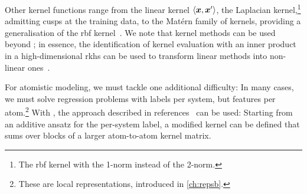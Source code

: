 Other kernel functions range from the linear kernel $\braket{\boldsymbol{x}, \boldsymbol{x}'}$, the Laplacian kernel,\footnote{The \gls{rbf} kernel with the 1-norm instead of the 2-norm.} admitting cusps at the training data, to the Matérn family of kernels, providing a generalisation of the \gls{rbf} kernel~\cite{r2015Bq,rasmussen2006}.
We note that kernel methods can be used beyond \krr; in essence, the identification of kernel evaluation with an inner product in a high-dimensional \gls{rkhs} can be used to transform linear methods into non-linear ones~\cite{ssm1998Bm,mmts2001m,hss2008m}.


For atomistic modeling, we must tackle one additional difficulty: In many cases, we must solve regression problems with labels per system, but features per atom.\footnote{These are local representations, introduced in \cref{ch:repsb}.}
With \krr, the approach described in references~\cite{bc2015q,m2015q,lgr2022q} can be used: Starting from an additive ansatz for the per-system label, a modified kernel can be defined that sums over blocks of a larger atom-to-atom kernel matrix.

